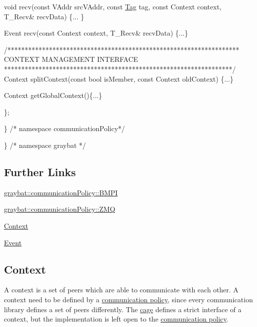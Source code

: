 \begin{DoxyCode}
            \textcolor{keywordtype}{void} recv(\textcolor{keyword}{const} VAddr srcVAddr, \textcolor{keyword}{const} \hyperlink{structTag}{Tag} tag, \textcolor{keyword}{const} Context context, T\_Recv& recvData) \{...
      \}

            Event recv(\textcolor{keyword}{const} Context context, T\_Recv& recvData) \{...\}


            \textcolor{comment}{/*******************************************************************}
\textcolor{comment}{               CONTEXT MANAGEMENT INTERFACE}
\textcolor{comment}{             ******************************************************************/}
            Context splitContext(\textcolor{keyword}{const} \textcolor{keywordtype}{bool} isMember, \textcolor{keyword}{const} Context oldContext) \{...\}

            Context getGlobalContext()\{...\}

        \};

    \} \textcolor{comment}{/* namespace communicationPolicy*/}

\} \textcolor{comment}{/* namespace graybat */}
\end{DoxyCode}


\subsection*{Further Links}


\begin{DoxyItemize}
\item \hyperlink{structgraybat_1_1communicationPolicy_1_1BMPI}{graybat\+::communication\+Policy\+::\+B\+M\+P\+I}
\item \hyperlink{structgraybat_1_1communicationPolicy_1_1ZMQ}{graybat\+::communication\+Policy\+::\+Z\+M\+Q}
\item \hyperlink{context}{Context}
\item \hyperlink{event}{Event} 
\end{DoxyItemize}\hypertarget{context}{}\subsection{Context}\label{context}
A context is a set of peers which are able to communicate with each other. A context need to be defined by a \hyperlink{communicationPolicy}{communication policy}, since every communication library defines a set of peers differently. The \hyperlink{cage}{cage} defines a strict interface of a context, but the implementation is left open to the \hyperlink{communicationPolicy}{communication policy}.

